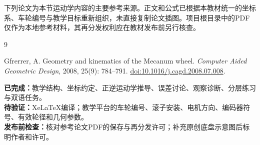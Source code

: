 \documentclass[UTF8,zihao=-4]{ctexart}
\begin{document}
下列论文为本节运动学内容的主要参考来源。正文和公式已根据本教材统一的坐标系、车轮编号与教学目标重新组织，未直接复制论文插图。项目根目录中的PDF仅作为本地参考材料，其再分发权利应在教材发布前另行核查。

\begin{thebibliography}{9}

Gfrerrer, A.
Geometry and kinematics of the Mecanum wheel.
\emph{Computer Aided Geometric Design}, 2008, 25(9): 784--791.
\href{https://doi.org/10.1016/j.cagd.2008.07.008}{doi:10.1016/j.cagd.2008.07.008}.

\end{thebibliography}

\noindent
\textbf{已完成：}教学结构、坐标约定、正逆运动学推导、误差讨论、观察诊断、分层练习与双语任务。\\
\textbf{待验证：}XeLaTeX编译；教学平台的车轮编号、滚子安装、电机方向、编码器符号、有效轮径和几何参数。\\
\textbf{发布前检查：}核对参考论文PDF的保存与再分发许可；补充原创底盘示意图后标明作者和许可。
\end{document}
